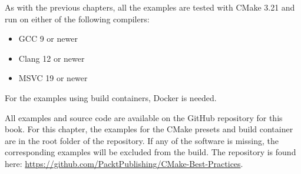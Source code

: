 As with the previous chapters, all the examples are tested with CMake 3.21 and run on either of the following compilers:

\begin{itemize}
\item 
GCC 9 or newer

\item 
Clang 12 or newer

\item 
MSVC 19 or newer
\end{itemize}

For the examples using build containers, Docker is needed.

All examples and source code are available on the GitHub repository for this book. For this chapter, the examples for the CMake presets and build container are in the root folder of the repository. If any of the software is missing, the corresponding examples will be excluded from the build. The repository is found here: \url{https://github.com/PacktPublishing/CMake-Best-Practices}.










